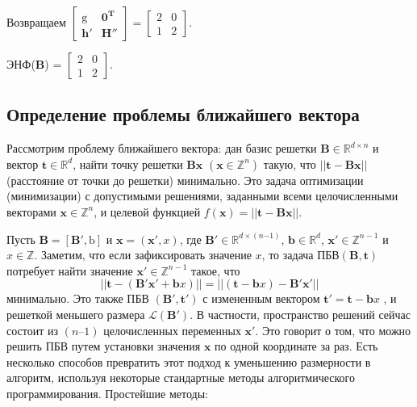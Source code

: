 \begin{enumerate}
Возвращаем $ \left[\begin{array}{cccc}
\mathrm{g} & \mathbf{0}^\mathbf{T} \\
\mathbf{h}' & \mathbf{H}''
\end{array}\right] = \left[\begin{array}{cccc}
2 & 0 \\
1 & 2
\end{array}\right] $.
\end{enumerate}

ЭНФ($ \mathbf{B} $) = $ \left[\begin{array}{cccc}
2 & 0 \\
1 & 2
\end{array}\right] $.

\subsection{Определение проблемы ближайшего вектора}

Рассмотрим проблему ближайшего вектора: дан базис решетки $ \mathbf{B} \in \mathbb{R}^{d \times n} $ и вектор $ \mathbf{t} \in \mathbb{R}^d $, найти точку решетки $ \mathbf{Bx} $ $ (\mathbf{x} \in \mathbb{Z}^n) $ такую, что $ ||\mathbf{t - Bx}|| $ (расстояние от точки до решетки) минимально. Это задача оптимизации (минимизации) с допустимыми решениями, заданными всеми целочисленными векторами $ \mathbf{x} \in \mathbb{Z}^n $, и целевой функцией $ f(\mathbf{x}) = ||\mathbf{t - Bx}|| $.

Пусть $ \mathbf{B} = [\mathbf{B}', \mathrm{b}] $ и $ \mathbf{x} = (\mathbf{x}', x) $, где $ \mathbf{B}' \in \mathbb{R}^{d \times \left( n \mathrm{-} 1 \right)} $, $ \mathbf{b} \in \mathbb{R}^d $, $ \mathbf{x}' \in \mathbb{Z}^{n-1} $ и $ x \in \mathbb{Z} $.
Заметим, что если зафиксировать значение $ x $, то задача $ \text{ПБВ}(\mathbf{B, t}) $ потребует найти значение $ \mathbf{x}' \in \mathbb{Z}^{n - 1} $ такое, что 
$$ ||\mathbf{t} - (\mathbf{B}'\mathbf{x}' + \mathbf{b}x)|| = ||(\mathbf{t} - \mathbf{b}x)-\mathbf{B}'\mathbf{x}'|| $$ 
минимально. Это также ПБВ $ (\mathbf{B}', \mathbf{t}') $ с измененным вектором $ \mathbf{t}' = \mathbf{t} - \mathbf{b}x$ , и решеткой меньшего размера $ \mathcal{L}(\mathbf{B}') $. В частности, пространство решений сейчас состоит из $ (n – 1) $ целочисленных переменных $ \mathbf{x}' $. Это говорит о том, что можно решить ПБВ путем установки значения $ \mathbf{x} $ по одной координате за раз.
Есть несколько способов превратить этот подход к уменьшению размерности в алгоритм, используя некоторые стандартные методы алгоритмического программирования. Простейшие методы:

